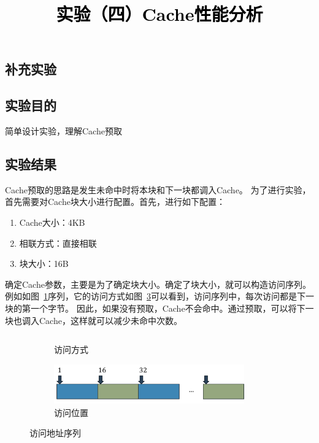 \documentclass[a4paper,twoside]{article}
\newcommand{\PaperTitle}{实验（四）Cache性能分析}  %
\begin{document}
\newpage

\title{
	\Large{\textcolor{black}{\PaperTitle}}
}
	
	
\maketitle
	
\tableofcontents
 
\newpage
\setcounter{page}{1}

\begin{spacing}{1.2}

\section{补充实验}

\subsection{实验目的}

简单设计实验，理解Cache预取

\subsection{实验结果}

Cache预取的思路是发生未命中时将本块和下一块都调入Cache。
为了进行实验，首先需要对Cache块大小进行配置。首先，进行如下配置：
\begin{enumerate}
	\item Cache大小：4KB
	\item 相联方式：直接相联
	\item 块大小：16B
\end{enumerate}
确定Cache参数，主要是为了确定块大小。确定了块大小，就可以构造访问序列。
例如如图~\ref{fig:addrin}序列，它的访问方式如图~\ref{fig:addracc}可以看到，访问序列中，每次访问都是下一块的第一个字节。
因此，如果没有预取，Cache不会命中。通过预取，可以将下一块也调入Cache，这样就可以减少未命中次数。
\begin{figure}[htb]
	\centering
	\begin{subfigure}{0.4\textwidth}
		\centering
		\caption{访问方式}
		\label{fig:addrin}
		\inputminted{python}{../code/addr.din}
	\end{subfigure}
	\begin{subfigure}{0.4\textwidth}
		\centering
		\caption{访问位置}
		\label{fig:addracc}
		\includegraphics[width=0.9\textwidth]{pattern.png}
	\end{subfigure}
	\caption{访问地址序列}
\end{figure}


\end{spacing}
\end{document}
